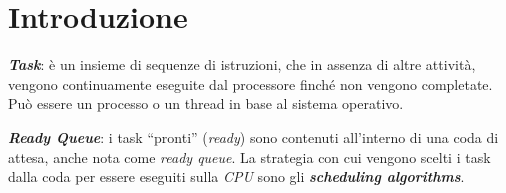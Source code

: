 \chapter{Introduzione}
\textbf{\textit{Task}}: è un insieme di sequenze di istruzioni, che in assenza di altre attività, vengono continuamente eseguite dal processore finché non vengono completate. \\
Può essere un processo o un thread in base al sistema operativo.
\begin{center}
\end{center}

\textbf{\textit{Ready Queue}}: i task ``pronti'' (\textit{ready}) sono contenuti all'interno di una coda di attesa, anche nota come \textit{ready queue}. La strategia con cui vengono scelti i task dalla coda per essere eseguiti sulla \textit{CPU} sono gli \textbf{\textit{scheduling algorithms}}.

